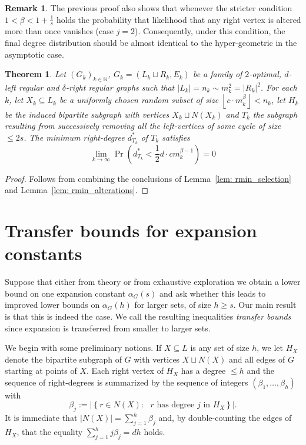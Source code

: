 \documentclass[12pt]{amsart}
\newtheorem{theorem}[lemma]{Theorem}
\theoremstyle{definition}
\newtheorem{remark}[lemma]{Remark}
\renewcommand{\geq}{\geqslant}
\renewcommand{\leq}{\leqslant}
\newcommand{\NN}{\ensuremath{\mathbb{N}}}
\newcommand{\1}{\ensuremath{\mathbb{1}}}
\begin{document}
\begin{remark}\label{remark_stronger_exponent} The previous proof also shows that whenever the stricter condition $1<\beta<1+\frac{1}{s}$ holds the probability that likelihood that any right vertex is altered more than once vanishes (case $j=2$). Consequently, under this condition, the final degree distribution should be almost identical to the hyper-geometric in the asymptotic case. 
\end{remark}


\begin{theorem} \label{thm: rmin_main} Let $(G_k)_{k \in \NN}$, $G_k = (L_k \sqcup R_k,E_k)$ be a family of $2$-optimal, $d$-left regular and $\delta$-right regular graphs such that $|L_k| = n_k \sim m_k^2 = |R_k|^2$. For each $k$, let $X_k \subseteq L_k$ be a uniformly chosen random subset of size $\left\lfloor c\cdot m_k^{\beta}\right \rfloor<n_k$, let $H_k$ be the induced bipartite subgraph with vertices $X_k\sqcup N(X_k)$ and $T_k$ the subgraph resulting from successively removing all the left-vertices of some cycle of size $\leq 2s$. The minimum right-degree $d_{T_k}^*$ of $T_k$ satisfies 
    \[\lim_{k\rightarrow \infty}\Pr\left(d_{T_k}^* < \frac{1}{2} d \cdot cm_k^{\beta-1}\right)= 0\]
\end{theorem}
\begin{proof} Follows from combining the conclusions of Lemma~\ref{lem: rmin_selection} and Lemma~\ref{lem: rmin_alterations}.
\end{proof}





\section{Transfer bounds for expansion constants}

Suppose that either from theory or from exhaustive exploration we obtain a lower bound on one expansion constant $\alpha_G(s)$ and ask whether this leads to improved lower bounds on $\alpha_G(h)$ for larger sets, of size $h\geq s$. Our main result is that this is indeed the case. We call the resulting inequalities \emph{transfer bounds} since expansion is transferred from smaller to larger sets.

We begin with some preliminary notions. If $X\subseteq L$ is any set of size $h$, we let $H_X$ denote the bipartite subgraph of $G$ with vertices $X\sqcup N(X)$ and all edges of $G$ starting at points of $X$. Each right vertex of $H_X$ has a degree $\leq h$ and the sequence of right-degrees is summarized by the sequence of integers $(\beta_1,\dots, \beta_h)$ with
\[\beta_j:= \left|\left\{r\in N(X): \text{ $r$ has degree $j$ in $H_X$}\right\}\right|.\]
It is immediate that $|N(X)|=\sum_{j=1}^h\beta_j$ and, by double-counting the edges of $H_X$, that the equality
$\sum_{j=1}^h j\beta_j = dh$ holds.
\end{document}
